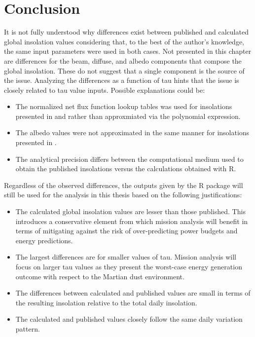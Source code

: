 \section{Conclusion}
It is not fully understood why differences exist between published and calculated global insolation values considering that, to the best of the author's knowledge, the same input parameters were used in both cases. Not presented in this chapter are differences for the beam, diffuse, and albedo components that compose the global insolation. These do not suggest that a single component is the source of the issue. Analyzing the differences as a function of tau hints that the issue is closely related to tau value inputs. Possible explanations could be:
\begin{itemize}
    \item The normalized net flux function lookup tables was used for insolations presented in  and  rather than approxmiated via the polynomial expression.
    \item The albedo values were not approximated in the same manner for insolations presented in .
    \item The analytical precision differs between the computational medium used to obtain the published insolations versus the calculations obtained with R.
\end{itemize}

Regardless of the observed differences, the outputs given by the R package will still be used for the analysis in this thesis based on the following justifications:
\begin{itemize}
  \item The calculated global insolation values are lesser than those published. This introduces a conservative element from which mission analysis will benefit in terms of mitigating against the risk of over-predicting power budgets and energy predictions.
  \item The largest differences are for smaller values of tau. Mission analysis will focus on larger tau values as they present the worst-case energy generation outcome with respect to the Martian dust environment.
  \item The differences between calculated and published values are small in terms of the resulting insolation relative to the total daily insolation.
  \item The calculated and published values closely follow the same daily variation pattern.
\end{itemize}

\clearpage
